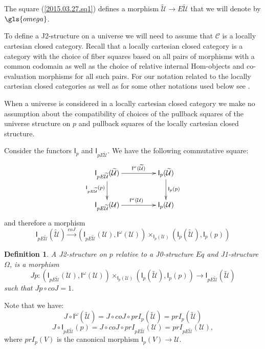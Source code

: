 \documentclass[12pt]{article}
\numberwithin{equation}{section}
\newenvironment{eq}{\begin{equation}}{\end{equation}}
\newtheorem{definition}[proposition]{Definition}
\newcommand{\llabel}[1]{\label{#1}}
\newcommand{\sr}{\rightarrow}
\newcommand{\lr}{\longrightarrow}
\newcommand{\wt}{\widetilde}
\newcommand{\id}{1}            %
\newcommand{\U}{\mathcal{U}}
\newcommand{\I}{\mathsf{I}}
\begin{document}
The square (\ref{2015.03.27.sq1}) defines a morphism $\wt{\U}\sr E\wt{\U}$ that
we will denote by $\gls{omega}$.

To define a J2-structure on a universe we will need to assume that $\mathcal C$
is a locally cartesian closed category.  Recall that a locally cartesian closed
category is a category with the choice of fiber squares based on all pairs of
morphisms with a common codomain as well as the choice of relative internal
Hom-objects and co-evaluation morphisms for all such pairs. For our notation
related to the locally cartesian closed categories as well as for some other
notations used below see \cite{fromunivwithPi}.

When a universe is considered in a locally cartesian closed category we make no
assumption about the compatibility of choices of the pullback squares of the
universe structure on $p$ and pullback squares of the locally cartesian closed
structure.

Consider the functors $\I_{p}$ and $\I_{pE\wt{\U}}$. We have the following
commutative square:
%
\begin{eq}\llabel{2010.sq1}
\begin{xy}
          \xymatrix@C=4pc{ \I_{pE\wt{\U}}(\wt{\U}) \ar[r]^-{\I^{\omega}(\wt{\U})}
            \ar[d]_{\I_{pE\wt{\U}}(p)} & \I_p(\wt{\U})
            \ar[d]^{\I_p(p)}\\ \I_{pE\wt{\U}}(\U) \ar[r]^{\I^{\omega}(\U)} & \I_p(\U) }
\end{xy}
\end{eq}%
%
and therefore a morphism
%
$$\I_{pE\wt{\U}}(\wt{\U}) \stackrel{coJ}{\lr} (\I_{pE\wt{\U}}(\U), \I^{\omega}(\U))
\times_{\I_p(\U)} (\I_p(\wt{\U}), \I_p(p))
$$
%
\begin{definition}
\llabel{2015.03.27.def6} A J2-structure on $p$ relative to a J0-structure $Eq$
and J1-structure $\Omega$, is a morphism
%
$$ Jp:( \I_{pE\wt{\U}}(\U), \I^{\omega}(\U))\times_{\I_p(\U)} (\I_p(\wt{\U}), \I_p(p))\sr
\I_{pE\wt{\U}}(\wt{\U}) $$
%
such that $Jp\circ coJ = \id$.
\end{definition}
%
Note that we have:
%
\begin{eq}
\llabel{2015.04.04.eq1} J\circ \I^{\omega}(\wt{\U})=J\circ coJ\circ
prI_p(\wt{\U})=prI_{p}(\wt{\U})
\end{eq}%
%
\begin{eq}
\llabel{2015.04.04.eq2} J\circ \I_{pE\wt{\U}}(p)=J\circ coJ\circ
prI_{pE\wt{\U}}(\U)=prI_{pE\wt{\U}}(\U),
\end{eq}%
%
where $prI_p(V)$ is the canonical morphism $\I_p(V)\sr \U$.
\end{document}
